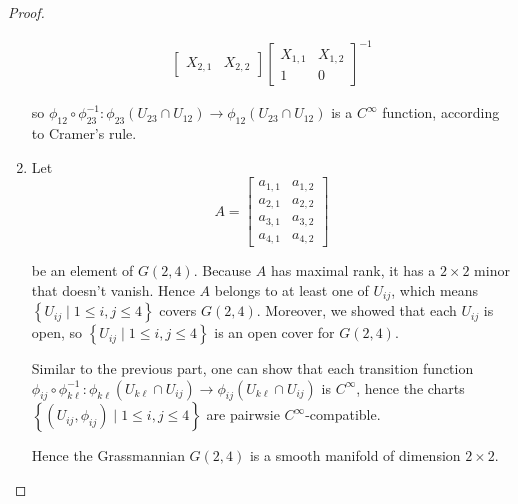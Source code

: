 \begin{proof}
\begin{enumerate}[label={(\alph*)},leftmargin=*]
\begin{align*}
\begin{bmatrix}
				                                                                                                                                                                                 X_{2,1} & X_{2,2}
			                                                                                                                                                                                 \end{bmatrix} {\begin{bmatrix}
				                                                                                                                                                                                                X_{1,1} & X_{1,2} \\
				                                                                                                                                                                                                1       & 0
			                                                                                                                                                                                                \end{bmatrix}}^{-1}
		      \end{align*}
		      \endgroup

		      so \( \phi_{12} \circ \phi_{23}^{-1}: \phi_{23}(U_{23} \cap U_{12}) \to \phi_{12}(U_{23} \cap U_{12}) \) is a \( C^{\infty} \) function, according to Cramer's rule.
		\item Let
		      \[
			      A = \begin{bmatrix}
                      a_{1,1} & a_{1,2} \\
                      a_{2,1} & a_{2,2} \\
                      a_{3,1} & a_{3,2} \\
                      a_{4,1} & a_{4,2}
                  \end{bmatrix}
		      \]

		      be an element of \( G(2, 4) \). Because \( A \) has maximal rank, it has a \( 2\times 2 \) minor that doesn't vanish. Hence \( A \) belongs to at least one of \( U_{ij} \), which means \( \left\{ U_{ij} \mid 1\leq i, j\leq 4 \right\} \) covers \( G(2, 4) \). Moreover, we showed that each \( U_{ij} \) is open, so  \( \left\{ U_{ij} \mid 1\leq i, j\leq 4 \right\} \) is an open cover for \( G(2, 4) \).

              Similar to the previous part, one can show that each transition function \( \phi_{ij} \circ \phi_{k\ell}^{-1}: \phi_{k\ell}(U_{k\ell} \cap U_{ij}) \to \phi_{ij}(U_{k\ell}\cap U_{ij}) \) is \( C^{\infty} \), hence the charts \( \left\{ (U_{ij}, \phi_{ij}) \mid 1\leq i, j\leq 4 \right\} \) are pairwsie \( C^{\infty} \)-compatible.

              Hence the Grassmannian \( G(2, 4) \) is a smooth manifold of dimension \( 2\times 2 \).
	\end{enumerate}
\end{proof}

